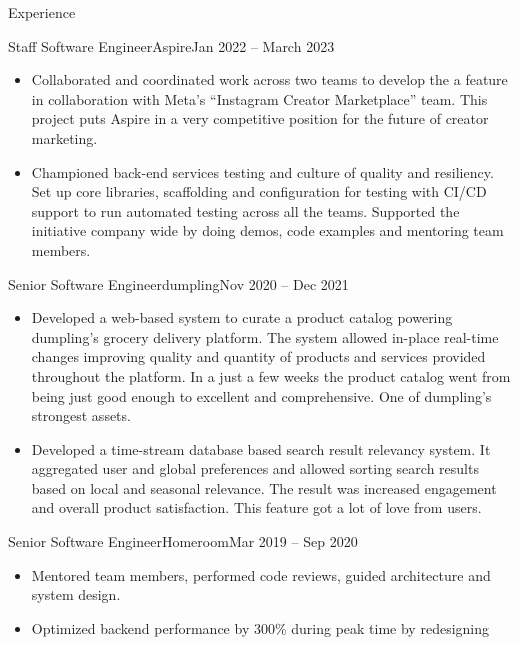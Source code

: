 \documentclass{mcdowellcv}
\begin{document}
\begin{cvsection}{Experience}
	\begin{cvsubsection}{Staff Software Engineer}{Aspire}{Jan 2022 -- March 2023}
		\begin{itemize}
    \item Collaborated and coordinated work across two teams to develop the a
      feature in collaboration with Meta's ``Instagram Creator Marketplace''
      team. This project puts Aspire in a very competitive position for the
      future of creator marketing.
    \item Championed back-end services testing and culture of quality and
      resiliency. Set up core libraries, scaffolding and configuration for
      testing  with CI/CD support to run automated testing across all the teams.
      Supported the initiative company wide by doing demos, code examples and
      mentoring team members.
		\end{itemize}
  \end{cvsubsection}
	\begin{cvsubsection}{Senior Software Engineer}{dumpling}{Nov 2020 -- Dec 2021}
		\begin{itemize}
    \item Developed a web-based system to curate a product catalog powering dumpling's
      grocery delivery platform. The system allowed in-place real-time changes
      improving quality and quantity of products and services provided
      throughout the platform. In a just a few weeks the product catalog went
      from being just good enough to excellent and comprehensive. One of
      dumpling's strongest assets.
    \item Developed a time-stream database based search result relevancy
      system. It aggregated user and global preferences and allowed sorting
      search results based on local and seasonal relevance. The result was
      increased engagement and overall product satisfaction. This feature got a
      lot of love from users.
		\end{itemize}
	\end{cvsubsection}
	\begin{cvsubsection}{Senior Software Engineer}{Homeroom}{Mar 2019 -- Sep 2020}
		\begin{itemize}
    \item Mentored team members, performed code reviews, guided architecture and
      system design.
    \item Optimized backend performance by 300\% during peak time by redesigning

\end{itemize}
\end{cvsubsection}
\end{cvsection}
\end{document}
